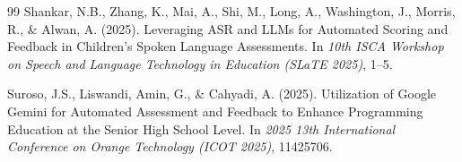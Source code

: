 \documentclass[11pt,a4paper]{article}
\begin{document}
\begin{thebibliography}{99}
Shankar, N.B., Zhang, K., Mai, A., Shi, M., Long, A., Washington, J., Morris, R., \& Alwan, A. (2025). Leveraging ASR and LLMs for Automated Scoring and Feedback in Children's Spoken Language Assessments. In \textit{10th ISCA Workshop on Speech and Language Technology in Education (SLaTE 2025)}, 1--5.

Suroso, J.S., Liswandi, Amin, G., \& Cahyadi, A. (2025). Utilization of Google Gemini for Automated Assessment and Feedback to Enhance Programming Education at the Senior High School Level. In \textit{2025 13th International Conference on Orange Technology (ICOT 2025)}, 11425706.

\end{thebibliography}
\end{document}
